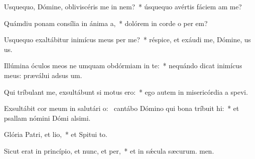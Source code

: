 \item Usquequo, Dómine, obliviscéris me in nem?~* úsquequo avértis fáciem am  me?
\item Quámdiu ponam consília in ánima a,~* dolórem in corde o per em?
\item Usquequo exaltábitur inimícus meus per me?~* réspice, et exáudi me, Dómine, us us.
\item Illúmina óculos meos ne umquam obdórmiam in te:~* nequándo dicat inimícus meus: præválui adsus um.
\item Qui tríbulant me, exsultábunt si motus ero:~* ego autem in misericórdia a spevi.
\item Exsultábit cor meum in salutári o:~\pscross{} cantábo Dómino qui bona tríbuit hi:~* et psallam nómini Dómi alsimi.
\item Glória Patri, et lio,~* et Spitui to.
\item Sicut erat in princípio, et nunc, et per,~* et in sǽcula sæcurum. men.
